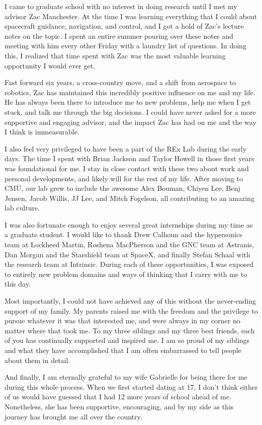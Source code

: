 \documentclass[12pt]{cmuthesis}
\begin{document}
\begin{acknowledgments}
I came to graduate school with no interest in doing research until I met my advisor Zac Manchester. At the time I was learning everything that I could about spacecraft guidance, navigation, and control, and I got a hold of Zac's lecture notes on the topic. I spent an entire summer pouring over these notes and meeting with him every other Friday with a laundry list of questions. In doing this, I realized that time spent with Zac was the most valuable learning opportunity I would ever get.

Fast forward six years, a cross-country move, and a shift from aerospace to robotics, Zac has maintained this incredibly positive influence on me and my life.  He has always been there to introduce me to new problems, help me when I get stuck, and talk me through the big decisions. I could have never asked for a more supportive and engaging advisor, and the impact Zac has had on me and the way I think is immeasurable.

I also feel very privileged to have been a part of the REx Lab during the early days. The time I spent with Brian Jackson and Taylor Howell in those first years was foundational for me.  I stay in close contact with these two about work and personal developments, and likely will for the rest of my life. After moving to CMU, our lab grew to include the awesome Alex Bouman, Chiyen Lee, Benj Jensen, Jacob Willis, JJ Lee, and Mitch Fogelson, all contributing to an amazing lab culture.

I was also fortunate enough to enjoy several great internships during my time as a graduate student. I would like to thank Drew Calhoun and the hypersonics team at Lockheed Martin, Roshena MacPherson and the GNC team at Astranis, Dan Morgan and the Starshield team at SpaceX, and finally Stefan Schaal with the research team at Intrinsic. During each of these opportunities, I was exposed to entirely new problem domains and ways of thinking that I carry with me to this day.

Most importantly, I could not have achieved any of this without the never-ending support of my family. My parents raised me with the freedom and the privilege to pursue whatever it was that interested me, and were always in my corner no matter where that took me. To my three siblings and my three best friends, each of you has continually supported and inspired me. I am so proud of my siblings and what they have accomplished that I am often embarrassed to tell people about them in detail.

And finally, I am eternally grateful to my wife Gabrielle for being there for me during this whole process. When we first started dating at 17, I don't think either of us would have guessed that I had 12 more years of school ahead of me.  Nonetheless, she has been supportive, encouraging, and by my side as this journey has brought me all over the country.


\end{acknowledgments}
\restoregeometry
\end{document}
